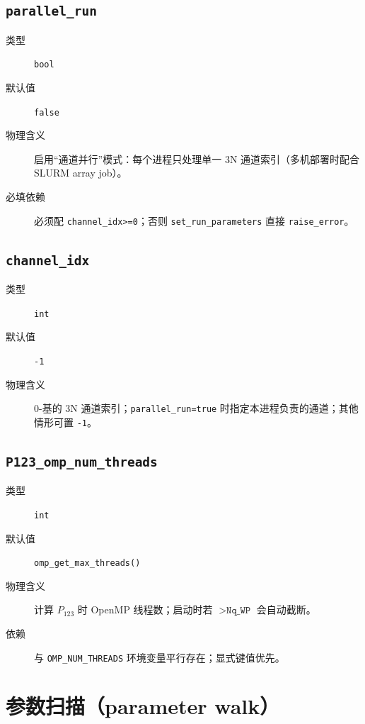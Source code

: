 \subsection{\texttt{parallel\_run}}

\begin{description}
  \item[类型] \texttt{bool}
  \item[默认值] \texttt{false}
  \item[物理含义] 启用“通道并行”模式：每个进程只处理单一 3N 通道索引（多机部署时配合 SLURM array job）。
  \item[必填依赖] 必须配 \texttt{channel\_idx>=0}；否则 \texttt{set\_run\_parameters} 直接 \texttt{raise\_error}。
\end{description}

\subsection{\texttt{channel\_idx}}

\begin{description}
  \item[类型] \texttt{int}
  \item[默认值] \texttt{-1}
  \item[物理含义] \(0\)-基的 3N 通道索引；\texttt{parallel\_run=true} 时指定本进程负责的通道；其他情形可置 \texttt{-1}。
\end{description}

\subsection{\texttt{P123\_omp\_num\_threads}}

\begin{description}
  \item[类型] \texttt{int}
  \item[默认值] \texttt{omp\_get\_max\_threads()}
  \item[物理含义] 计算 \(P_{123}\) 时 OpenMP 线程数；启动时若 \(>\texttt{Nq\_WP}\) 会自动截断。
  \item[依赖] 与 \texttt{OMP\_NUM\_THREADS} 环境变量平行存在；显式键值优先。
\end{description}

\section{参数扫描（parameter walk）}
\label{sec:appE_param_walk}


